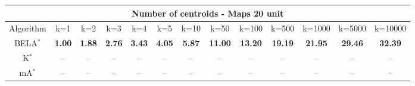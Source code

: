 \begin{tabular}{c|cccccccccccc}\toprule
\multicolumn{13}{c}{Number of centroids - Maps 20 unit}\\ \midrule
Algorithm & k=1 & k=2 & k=3 & k=4 & k=5 & k=10 & k=50 & k=100 & k=500 & k=1000 & k=5000 & k=10000 \\ \midrule
BELA$^*$ & \textbf{1.00} & \textbf{1.88} & \textbf{2.76} & \textbf{3.43} & \textbf{4.05} & \textbf{5.87} & \textbf{11.00} & \textbf{13.20} & \textbf{19.19} & \textbf{21.95} & \textbf{29.46} & \textbf{32.39} \\
K$^*$ & -- & -- & -- & -- & -- & -- & -- & -- & -- & -- & -- & -- \\
mA$^*$ & -- & -- & -- & -- & -- & -- & -- & -- & -- & -- & -- & -- \\ \bottomrule 
\end{tabular}
